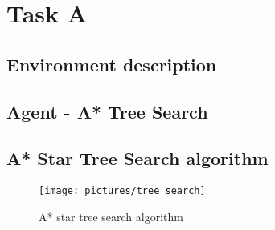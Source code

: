 
\chapter{Task A}
\section{Environment description}


\section{Agent - A* Tree Search}


\section{A* Star Tree Search algorithm}

\begin{description}
\item[]
\end{description}

\begin{figure}
\centering
\texttt{[image: pictures/tree\_search]}
\caption{A* star tree search algorithm}
\end{figure}


